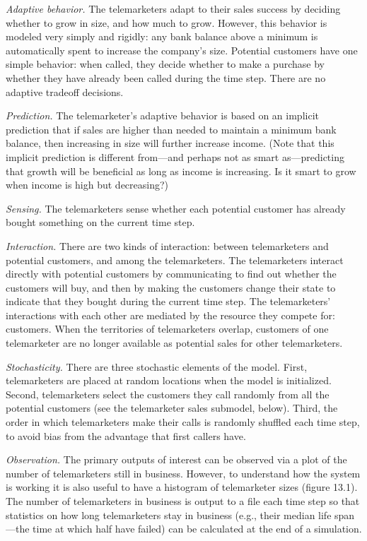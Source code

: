 \documentclass[]{article}
\begin{document}
\emph{Adaptive behavior.} The telemarketers adapt to their sales success
by deciding whether to grow in size, and how much to grow. However, this
behavior is modeled very simply and rigidly: any bank balance above a
minimum is automatically spent to increase the company's size. Potential
customers have one simple behavior: when called, they decide whether to
make a purchase by whether they have already been called during the time
step. There are no adaptive tradeoff decisions.

\emph{Prediction.} The telemarketer's adaptive behavior is based on an
implicit prediction that if sales are higher than needed to maintain a
minimum bank balance, then increasing in size will further increase
income. (Note that this implicit prediction is different from---and
perhaps not as smart as---predicting that growth will be beneficial as
long as income is increasing. Is it smart to grow when income is high
but decreasing?)

\emph{Sensing.} The telemarketers sense whether each potential customer
has already bought something on the current time step.

\emph{Interaction.} There are two kinds of interaction: between
telemarketers and potential customers, and among the telemarketers. The
telemarketers interact directly with potential customers by
communicating to find out whether the customers will buy, and then by
making the customers change their state to indicate that they bought
during the current time step. The telemarketers' interactions with each
other are mediated by the resource they compete for: customers. When the
territories of telemarketers overlap, customers of one telemarketer are
no longer available as potential sales for other telemarketers.

\emph{Stochasticity.} There are three stochastic elements of the model.
First, telemarketers are placed at random locations when the model is
initialized. Second, telemarketers select the customers they call
randomly from all the potential customers (see the telemarketer sales
submodel, below). Third, the order in which telemarketers make their
calls is randomly shuffled each time step, to avoid bias from the
advantage that first callers have.

\emph{Observation.} The primary outputs of interest can be observed via
a plot of the number of telemarketers still in business. However, to
understand how the system is working it is also useful to have a
histogram of telemarketer sizes (figure 13.1). The number of
telemarketers in business is output to a file each time step so that
statistics on how long telemarketers stay in business (e.g., their
median life span---the time at which half have failed) can be calculated
at the end of a simulation.
\end{document}

